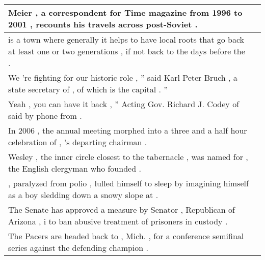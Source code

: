 \begin{table}
\begin{tabular}{p{} P{1,4cm} }
\hline
{} {Meier , a \underline{} correspondent for Time magazine from 1996 to 2001 , recounts his travels across post-Soviet \underline{} .} &    \\ 
\hline
{} {\underline{} is a town where generally it helps to have local roots that go back at least one or two generations , if not back to the days before the \underline{} .} &    \\ 
\hline
{} {We 're fighting for our historic role , '' said Karl Peter Bruch , a state secretary of \underline{} , of which \underline{} is the capital . ''} &    \\ 
\hline
{} {Yeah , you can have it back , '' Acting Gov. Richard J. Codey of \underline{} said by phone from \underline{} .} &    \\ 
\hline
{} {In 2006 , the annual meeting morphed into a three and a half hour celebration of \underline{} , \underline{} 's departing chairman .} &    \\ 
\hline
{} {Wesley , the inner circle closest to the tabernacle , was named for \underline{} , the English clergyman who founded \underline{} .} &    \\ 
\hline
{} {\underline{} , paralyzed from polio , lulled himself to sleep by imagining himself as a boy sledding down a snowy slope at \underline{} .} &    \\ 
\hline
{} {The Senate has approved a measure by Senator \underline{} , Republican of Arizona , i to ban abusive treatment of prisoners in \underline{} custody .} &    \\ 
\hline
{} {The Pacers are headed back to \underline{} , Mich. , for a conference semifinal series against the defending champion \underline{} .} &    \\ 

\end{tabular}
\end{table}

